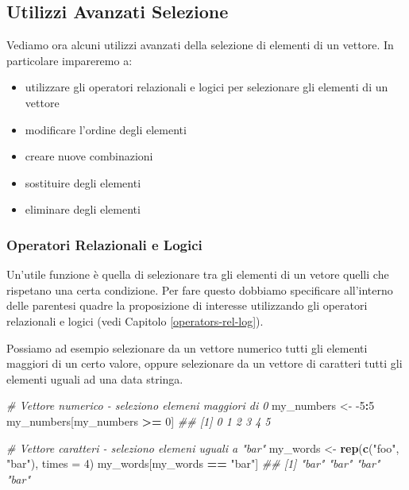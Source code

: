 \documentclass[
]{book}
\newenvironment{Shaded}{\begin{snugshade}}{\end{snugshade}}
\newcommand{\CommentTok}[1]{\textcolor[rgb]{0.56,0.35,0.01}{\textit{#1}}}
\newcommand{\DataTypeTok}[1]{\textcolor[rgb]{0.13,0.29,0.53}{#1}}
\newcommand{\DecValTok}[1]{\textcolor[rgb]{0.00,0.00,0.81}{#1}}
\newcommand{\KeywordTok}[1]{\textcolor[rgb]{0.13,0.29,0.53}{\textbf{#1}}}
\newcommand{\NormalTok}[1]{#1}
\newcommand{\OperatorTok}[1]{\textcolor[rgb]{0.81,0.36,0.00}{\textbf{#1}}}
\newcommand{\StringTok}[1]{\textcolor[rgb]{0.31,0.60,0.02}{#1}}
\providecommand{\tightlist}{%
  \setlength{\itemsep}{0pt}\setlength{\parskip}{0pt}}
\begin{document}
\hypertarget{utilizzi-avanzati-selezione}{%
\subsection{Utilizzi Avanzati Selezione}\label{utilizzi-avanzati-selezione}}

Vediamo ora alcuni utilizzi avanzati della selezione di elementi di un vettore. In particolare impareremo a:

\begin{itemize}
\tightlist
\item
  utilizzare gli operatori relazionali e logici per selezionare gli elementi di un vettore
\item
  modificare l'ordine degli elementi
\item
  creare nuove combinazioni
\item
  sostituire degli elementi
\item
  eliminare degli elementi
\end{itemize}

\hypertarget{operatori-relazionali-e-logici}{%
\subsubsection*{Operatori Relazionali e Logici}\label{operatori-relazionali-e-logici}}

Un'utile funzione è quella di selezionare tra gli elementi di un vetore quelli che rispetano una certa condizione. Per fare questo dobbiamo specificare all'interno delle parentesi quadre la proposizione di interesse utilizzando gli operatori relazionali e logici (vedi Capitolo \ref{operators-rel-log}).

Possiamo ad esempio selezionare da un vettore numerico tutti gli elementi maggiori di un certo valore, oppure selezionare da un vettore di caratteri tutti gli elementi uguali ad una data stringa.

\begin{Shaded}
\begin{Highlighting}[]
\CommentTok{# Vettore numerico - seleziono elemeni maggiori di 0}
\NormalTok{my_numbers <-}\StringTok{ }\DecValTok{-5}\OperatorTok{:}\DecValTok{5}
\NormalTok{my_numbers[my_numbers }\OperatorTok{>=}\StringTok{ }\DecValTok{0}\NormalTok{]}
\CommentTok{## [1] 0 1 2 3 4 5}

\CommentTok{# Vettore caratteri - seleziono elemeni uguali a "bar"}
\NormalTok{my_words <-}\StringTok{ }\KeywordTok{rep}\NormalTok{(}\KeywordTok{c}\NormalTok{(}\StringTok{"foo"}\NormalTok{, }\StringTok{"bar"}\NormalTok{), }\DataTypeTok{times =} \DecValTok{4}\NormalTok{)}
\NormalTok{my_words[my_words }\OperatorTok{==}\StringTok{ "bar"}\NormalTok{]}
\CommentTok{## [1] "bar" "bar" "bar" "bar"}
\end{Highlighting}
\end{Shaded}
\end{document}
